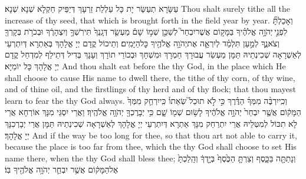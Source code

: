 {עַשָּׂרָא תְעַשַּׂר יָת כָּל עַלְלַת זַרְעָךְ דְּיַפֵּיק חַקְלָא שְׁנָא שְׁנָא׃}
{Thou shalt surely tithe all the increase of thy seed, that which is brought forth in the field year by year.}{}
{וְאָכַלְתָּ֞ לִפְנֵ֣י \legarmeh  יְהֹוָ֣ה אֱלֹהֶ֗יךָ בַּמָּק֣וֹם אֲשֶׁר\maqqaf יִבְחַר֮ לְשַׁכֵּ֣ן שְׁמ֣וֹ שָׁם֒ מַעְשַׂ֤ר דְּגָֽנְךָ֙ תִּירֹֽשְׁךָ֣ וְיִצְהָרֶ֔ךָ וּבְכֹרֹ֥ת בְּקָרְךָ֖ וְצֹאנֶ֑ךָ לְמַ֣עַן תִּלְמַ֗ד לְיִרְאָ֛ה אֶת\maqqaf יְהֹוָ֥ה אֱלֹהֶ֖יךָ כׇּל\maqqaf הַיָּמִֽים׃}
{וְתֵיכוֹל קֳדָם יְיָ אֱלָהָךְ בְּאַתְרָא דְּיִתְרְעֵי לְאַשְׁרָאָה שְׁכִינְתֵיהּ תַּמָּן מַעְשַׂר עֲבוּרָךְ חַמְרָךְ וּמִשְׁחָךְ וּבְכוֹרֵי תוֹרָךְ וְעָנָךְ בְּדִיל דְּתֵילַף לְמִדְחַל קֳדָם יְיָ אֱלָהָךְ כָּל יוֹמַיָּא׃}
{And thou shalt eat before the \lord\space thy God, in the place which He shall choose to cause His name to dwell there, the tithe of thy corn, of thy wine, and of thine oil, and the firstlings of thy herd and of thy flock; that thou mayest learn to fear the \lord\space thy God always.}{}
{וְכִֽי\maqqaf יִרְבֶּ֨ה מִמְּךָ֜ הַדֶּ֗רֶךְ כִּ֣י לֹ֣א תוּכַל֮ שְׂאֵתוֹ֒ כִּֽי\maqqaf יִרְחַ֤ק מִמְּךָ֙ הַמָּק֔וֹם אֲשֶׁ֤ר יִבְחַר֙ יְהֹוָ֣ה אֱלֹהֶ֔יךָ לָשׂ֥וּם שְׁמ֖וֹ שָׁ֑ם כִּ֥י יְבָרֶכְךָ֖ יְהֹוָ֥ה אֱלֹהֶֽיךָ׃}
{וַאֲרֵי יִסְגֵּי מִנָּךְ אוֹרְחָא אֲרֵי לָא תִכּוֹל לְמִטְּלֵיהּ אֲרֵי יִתְרַחַק מִנָּךְ אַתְרָא דְּיִתְרְעֵי יְיָ אֱלָהָךְ לְאַשְׁרָאָה שְׁכִינְתֵיהּ תַּמָּן אֲרֵי יְבָרְכִנָּךְ יְיָ אֱלָהָךְ׃}
{And if the way be too long for thee, so that thou art not able to carry it, because the place is too far from thee, which the \lord\space thy God shall choose to set His name there, when the \lord\space thy God shall bless thee;}{}
{וְנָתַתָּ֖ה בַּכָּ֑סֶף וְצַרְתָּ֤ הַכֶּ֙סֶף֙ בְּיָ֣דְךָ֔ וְהָֽלַכְתָּ֙ אֶל\maqqaf הַמָּק֔וֹם אֲשֶׁ֥ר יִבְחַ֛ר יְהֹוָ֥ה אֱלֹהֶ֖יךָ בּֽוֹ׃}
